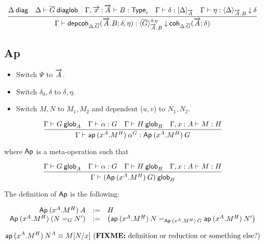 \begin{small}
\[
\infer
  {\ofdepglob{\Gamma}{\depcoh{\Delta.\diag G}{\tel A.B}{\delta}{\eta}}
    {\interpdepglob{\diag G}{\tel A.B}{\delta}{\eta}}{\coh{\Delta.\diag
    G}{\tel A}{\delta}}}
  {\wfdiag{\Delta}
  &\wfdiaglob{\Delta}{\diag G}
  &\wftype{\Gamma,\teltm xA}{B}
  &\ofinterp{\Gamma}{\delta}{\Delta}{\tel A}
  &\ofinterpdep{\Gamma}{\eta}{\Delta}{\tel A.B}{\delta}}
\]
\end{small}

\subsection{Ap}

\begin{itemize}
\item Switch $\Psi$ to $\tel A$.
\item Switch $\delta_0,\delta$ to $\delta,\eta$.
\item Switch $M,N$ to $M_1,M_2$ and dependent ($u,v$) to $N_1,N_2$.
\end{itemize}


\begin{small}
  \[\infer{\ofglob{\Gamma}{\ap{(x^A.M^H)}{\alpha^G}}
    {\Ap{(x^A.M^H)}{G}}}
  {\wfglob{\Gamma}{G}{A}
    & \ofglob{\Gamma}{\alpha}{G}
    & \wfglob{\Gamma}{H}{B}
    & \ofglob{\Gamma,x:A}{M}{H}}\]

  where $\dsd{Ap}$ is a meta-operation such that

  \[\infer{\wfglob{\Gamma}{(\Ap{(x^A.M^H)}{G})}
    {B}}
  {\wfglob{\Gamma}{G}{A}
    & \ofglob{\Gamma}{\alpha}{G}
    & \wfglob{\Gamma}{H}{B}
    & \ofglob{\Gamma,x:A}{M}{H}}\]

  The definition of $\dsd{Ap}$ is the following:

  \[
  \begin{array}{rcl}
    \Ap{(x^A.M^H)}{A} & := & H \\
    \Ap{(x^A.M^H)}{(\homj{G}{N}{N'})} & := & \left(
      \homj{\Ap{(x^A.M^H)}{G}}
      {\ap{(x^A.M^H)}{N}}{\ap{(x^A.M^H)}{N'}}\right)
  \end{array}
  \]
\end{small}

\begin{small}
  \[
  \ap{(x^A.M^H)}{N^A}  \equiv  \subst{M}{N}{x}
  \text{ (\FIXME{definition or reduction or something else?})} \\ \\
  \]
\end{small}

